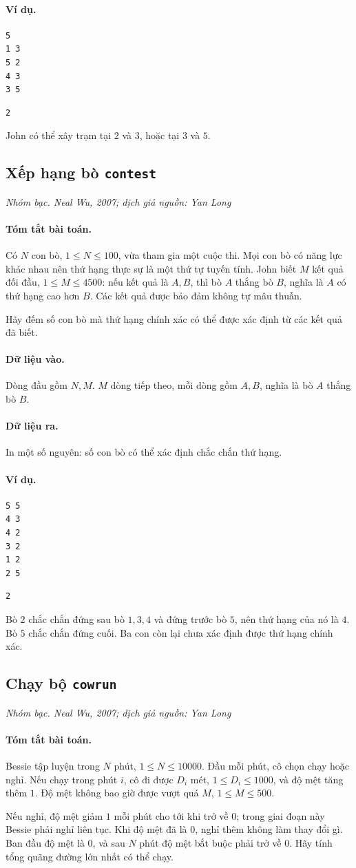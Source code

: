 \documentclass[11pt]{article}
\newcommand{\problem}[4]{%
  \subsection[#1 (#2)]{#1 \hfill {\normalsize\texttt{#2}}}%
  \noindent\textit{#3. #4}\par\smallskip
}
\newcommand{\iosec}[1]{\paragraph{#1}}
\begin{document}
\iosec{Ví dụ.}
\begin{verbatim}
5
1 3
5 2
4 3
3 5
\end{verbatim}

\begin{verbatim}
2
\end{verbatim}

John có thể xây trạm tại \(2\) và \(3\), hoặc tại \(3\) và \(5\).

\problem{Xếp hạng bò}{contest}{Nhóm bạc}{Neal Wu, 2007; dịch giả nguồn: Yan Long}

\iosec{Tóm tắt bài toán.}
Có \(N\) con bò, \(1\le N\le 100\), vừa tham gia một cuộc thi. Mọi con bò có
năng lực khác nhau nên thứ hạng thực sự là một thứ tự tuyến tính. John biết
\(M\) kết quả đối đầu, \(1\le M\le 4500\): nếu kết quả là \(A,B\), thì bò
\(A\) thắng bò \(B\), nghĩa là \(A\) có thứ hạng cao hơn \(B\). Các kết quả
được bảo đảm không tự mâu thuẫn.

Hãy đếm số con bò mà thứ hạng chính xác có thể được xác định từ các kết quả
đã biết.

\iosec{Dữ liệu vào.}
Dòng đầu gồm \(N,M\). \(M\) dòng tiếp theo, mỗi dòng gồm \(A,B\), nghĩa là
bò \(A\) thắng bò \(B\).

\iosec{Dữ liệu ra.}
In một số nguyên: số con bò có thể xác định chắc chắn thứ hạng.

\iosec{Ví dụ.}
\begin{verbatim}
5 5
4 3
4 2
3 2
1 2
2 5
\end{verbatim}

\begin{verbatim}
2
\end{verbatim}

Bò \(2\) chắc chắn đứng sau bò \(1,3,4\) và đứng trước bò \(5\), nên thứ hạng
của nó là \(4\). Bò \(5\) chắc chắn đứng cuối. Ba con còn lại chưa xác định
được thứ hạng chính xác.

\problem{Chạy bộ}{cowrun}{Nhóm bạc}{Neal Wu, 2007; dịch giả nguồn: Yan Long}

\iosec{Tóm tắt bài toán.}
Bessie tập luyện trong \(N\) phút, \(1\le N\le 10000\). Đầu mỗi phút, cô chọn
chạy hoặc nghỉ. Nếu chạy trong phút \(i\), cô đi được \(D_i\) mét,
\(1\le D_i\le 1000\), và độ mệt tăng thêm \(1\). Độ mệt không bao giờ được
vượt quá \(M\), \(1\le M\le 500\).

Nếu nghỉ, độ mệt giảm \(1\) mỗi phút cho tới khi trở về \(0\); trong giai
đoạn này Bessie phải nghỉ liên tục. Khi độ mệt đã là \(0\), nghỉ thêm không
làm thay đổi gì. Ban đầu độ mệt là \(0\), và sau \(N\) phút độ mệt bắt buộc
phải trở về \(0\). Hãy tính tổng quãng đường lớn nhất có thể chạy.
\end{document}
